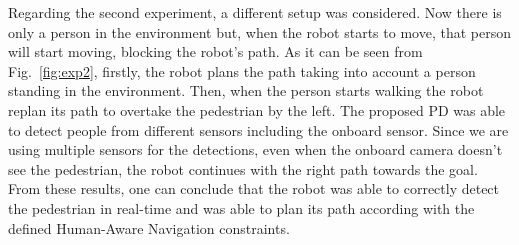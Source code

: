 \documentclass[5p,time]{elsarticle}
\begin{document}
\begin{figure*}
	\caption{Contrarily to the previous experiment, in this case only a person is in the environment and, instead of standing, he starts moving, blocking the robot's path. In this figure we show the environment and images taken from the cameras, similar to Fig.~\ref{fig:exp1}. From Figs.~\protect{}-\protect{} we can see that firstly the person is identified as standing, but when the robot starts moving, he also starts moving, thus the robot replans its path, in order to overtake the pedestrian by the left. Notice that, since we are using multiple sensors for the PD, even when the person is outside the onboard camera's FOV, the robot performs well because the pedestrian is identified by the external sensors.}
	\label{fig:exp2}
\end{figure*}

Regarding the second experiment, a different setup was considered. Now there is only a person in the environment but, when the robot starts to move, that person will start moving, blocking the robot's path. As it can be seen from Fig.~\ref{fig:exp2}, firstly, the robot plans the path taking into account a person standing in the environment. Then, when the person starts walking the robot replan its path to overtake the pedestrian by the left. The proposed PD was able to detect people from different sensors including the onboard sensor. Since we are using multiple sensors for the detections, even when the onboard camera doesn't see the pedestrian, the robot continues with the right path towards the goal. From these results, one can conclude that the robot was able to correctly detect the pedestrian in real-time and was able to plan its path according with the defined Human-Aware Navigation constraints.
\end{document}
